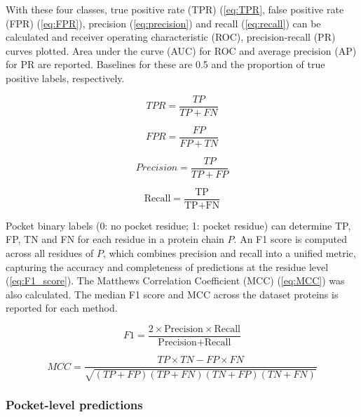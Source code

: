 With these four classes, true positive rate (TPR) (\autoref{eq:TPR}, false positive rate (FPR) (\autoref{eq:FPR}), precision (\autoref{eq:precision}) and recall (\autoref{eq:recall}) can be calculated and receiver operating characteristic (ROC), precision-recall (PR) curves plotted. Area under the curve (AUC) for ROC and average precision (AP) for PR are reported. Baselines for these are 0.5 and the proportion of true positive labels, respectively.

\begin{equation}
TPR = \frac{TP}{TP + FN}
\label{eq:TPR}
\end{equation}

\begin{equation}
FPR = \frac{FP}{FP + TN}
\label{eq:FPR}
\end{equation}

\begin{equation}
Precision = \frac{TP}{TP + FP}
\label{eq:precision}
\end{equation}

\begin{equation}
\text{Recall} = \frac{\text{TP}}{\text{TP} + \text{FN}}
\label{eq:recall}
\end{equation}

Pocket binary labels (0: no pocket residue; 1: pocket residue) can determine TP, FP, TN and FN for each residue in a protein chain $P$. An F1 score is computed across all residues of $P$, which combines precision and recall into a unified metric, capturing the accuracy and completeness of predictions at the residue level (\autoref{eq:F1_score}). The Matthews Correlation Coefficient (MCC) \cite{MATTHEWS_1975_MCC} (\autoref{eq:MCC}) was also calculated. The median F1 score and MCC across the dataset proteins is reported for each method.

\begin{equation}
F1 = \frac{2 \times \text{Precision} \times \text{Recall}}{\text{Precision} + \text{Recall}}
\label{eq:F1_score}
\end{equation}

\begin{equation}
MCC = \frac{TP \times TN - FP \times FN}{\sqrt{(TP + FP)(TP + FN)(TN + FP)(TN + FN)}}
\label{eq:MCC}
\end{equation}

\subsubsection{Pocket-level predictions}


